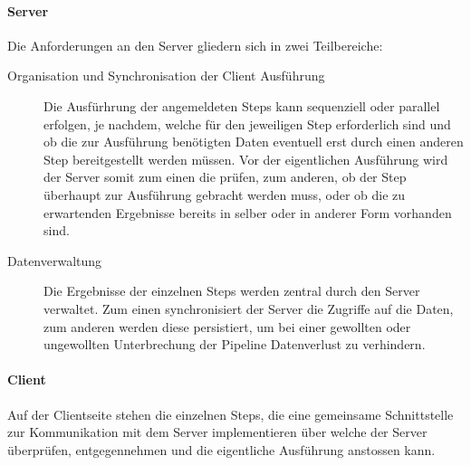 \paragraph{Server}
Die Anforderungen an den Server gliedern sich in zwei Teilbereiche:
\begin{description}
\item[Organisation und Synchronisation der Client Ausführung]
Die Ausfürhrung der angemeldeten Steps kann sequenziell oder
parallel erfolgen, je nachdem, welche  für den jeweiligen
Step erforderlich sind und ob die zur Ausführung benötigten Daten eventuell
erst durch einen anderen Step bereitgestellt werden müssen.
Vor der eigentlichen Ausführung wird der Server somit zum einen die
 prüfen, zum anderen, ob der Step überhaupt zur Ausführung
gebracht werden muss, oder ob die zu erwartenden Ergebnisse bereits in selber
oder in anderer Form vorhanden sind.
\item[Datenverwaltung] Die Ergebnisse der einzelnen Steps werden zentral durch
den Server verwaltet.
Zum einen synchronisiert der Server die Zugriffe auf die Daten, zum anderen
werden diese persistiert, um bei einer gewollten oder ungewollten Unterbrechung
der Pipeline Datenverlust zu verhindern.
\end{description}

\paragraph{Client}
Auf der Clientseite stehen die einzelnen Steps, die eine gemeinsame
Schnittstelle zur Kommunikation mit dem Server implementieren über welche der
Server  überprüfen, 
 entgegennehmen und die eigentliche Ausführung
anstossen kann.

